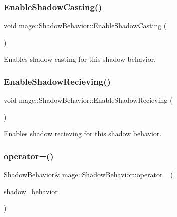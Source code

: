 \subsubsection{\texorpdfstring{Enable\+Shadow\+Casting()}{EnableShadowCasting()}}
{\footnotesize\ttfamily void mage\+::\+Shadow\+Behavior\+::\+Enable\+Shadow\+Casting (\begin{DoxyParamCaption}{ }\end{DoxyParamCaption})\hspace{0.3cm}{\ttfamily [noexcept]}}

Enables shadow casting for this shadow behavior. \hypertarget{structmage_1_1_shadow_behavior_a2677d74bb3efe1007d4e1de4a6f215d6}{}\label{structmage_1_1_shadow_behavior_a2677d74bb3efe1007d4e1de4a6f215d6} 
\subsubsection{\texorpdfstring{Enable\+Shadow\+Recieving()}{EnableShadowRecieving()}}
{\footnotesize\ttfamily void mage\+::\+Shadow\+Behavior\+::\+Enable\+Shadow\+Recieving (\begin{DoxyParamCaption}{ }\end{DoxyParamCaption})\hspace{0.3cm}{\ttfamily [noexcept]}}

Enables shadow recieving for this shadow behavior. \hypertarget{structmage_1_1_shadow_behavior_afb38f4c5287418da2d0eb5c1cc06c33a}{}\label{structmage_1_1_shadow_behavior_afb38f4c5287418da2d0eb5c1cc06c33a} 
\subsubsection{\texorpdfstring{operator=()}{operator=()}\hspace{0.1cm}{\footnotesize\ttfamily [1/2]}}
{\footnotesize\ttfamily \hyperlink{structmage_1_1_shadow_behavior}{Shadow\+Behavior}\& mage\+::\+Shadow\+Behavior\+::operator= (\begin{DoxyParamCaption}\item[{const \hyperlink{structmage_1_1_shadow_behavior}{Shadow\+Behavior} \&}]{shadow\+\_\+behavior }\end{DoxyParamCaption})\hspace{0.3cm}{\ttfamily [default]}}

